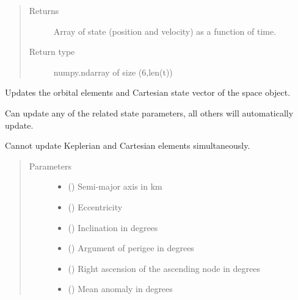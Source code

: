 \documentclass[letterpaper,10pt,english]{sphinxmanual}
\begin{document}
\begin{fulllineitems}
\begin{fulllineitems}
\begin{quote}
\begin{description}
\item[{Returns}] \leavevmode
Array of state (position and velocity) as a function of time.

\item[{Return type}] \leavevmode
numpy.ndarray of size (6,len(t))

\end{description}\end{quote}

\end{fulllineitems}


\begin{fulllineitems}
\label{\detokenize{modules/space_object:space_object.SpaceObject.update}}
Updates the orbital elements and Cartesian state vector of the space object.

Can update any of the related state parameters, all others will automatically update.

Cannot update Keplerian and Cartesian elements simultaneously.
\begin{quote}\begin{description}
\item[{Parameters}] \leavevmode\begin{itemize}
\item {} 
 () \textendash{} Semi-major axis in km

\item {} 
 () \textendash{} Eccentricity

\item {} 
 () \textendash{} Inclination in degrees

\item {} 
 () \textendash{} Argument of perigee in degrees

\item {} 
 () \textendash{} Right ascension of the ascending node in degrees

\item {} 
 () \textendash{} Mean anomaly in degrees


\end{itemize}
\end{description}
\end{quote}
\end{fulllineitems}
\end{fulllineitems}
\end{document}
